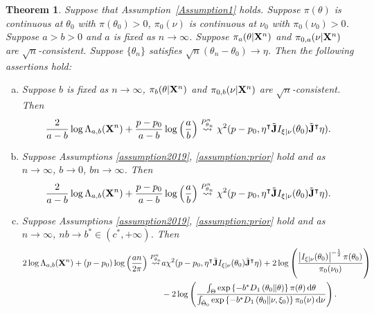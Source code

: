 \documentclass[11pt]{article}
\newcommand{\myT}{\intercal}
\theoremstyle{plain}
\newtheorem{theorem}{\quad\quad Theorem}
\theoremstyle{definition}
\theoremstyle{remark}
\begin{document}
\begin{theorem}\label{Thm:maintheorem}
    Suppose that Assumption~\ref{Assumption1} holds.
Suppose $\pi(\theta)$ is continuous at $\theta_0$ with $\pi(\theta_0)>0$, $\pi_0(\nu)$ is continuous at $\nu_0$ with $\pi_0 (\nu_0)> 0$.
Suppose $a>b>0$ and $a$ is fixed as $n\to \infty$.
    Suppose $\pi_a( \theta | \mathbf{X}^n)$ and $\pi_{0, a}(\nu | \mathbf{X}^n)$ are $\sqrt n$-consistent.
    Suppose $\{\theta_n\}$ satisfies $\sqrt{n}(\theta_n-\theta_0)\to \eta$.
Then the following assertions hold:
\begin{enumerate}[(a)]
        \item 
            Suppose $b$ is fixed  as $n\to \infty$,
            $\pi_b(\theta|\mathbf{X}^{n})$ and $\pi_{0,b}(\nu | \mathbf{X}^{n})$ are $\sqrt{n}$-consistent.
            Then
    $$
        \frac{2}{a-b}
        \log \Lambda_{a,b} (\BX^n)
        +\frac{p-p_0}{a-b}
        \log \left(\frac{a}{b}\right)
    \overset{P^n_{\theta_n}}{\rightsquigarrow} 
    \chi^2(p-p_0,\eta^\myT\tilde \BJ I_{\xi|\nu}(\theta_0) \tilde\BJ^\myT\eta)
.
    $$
\item
Suppose Assumptions
\ref{assumption2019}, \ref{assumption:prior} hold 
and
as $n \to \infty$, $b\to 0$, $bn \to \infty$.
Then
\begin{align*}
        \frac{2}{a-b}
    \log \Lambda_{a,b} (\BX^n)
+
\frac{p-p_0}{a-b}
\log \left(\frac{a}{b}\right)
\overset{P^n_{\theta_n}}{\rightsquigarrow}
    \chi^2(p-p_0, \eta^\myT\tilde \BJ I_{\xi|\nu}(\theta_0) \tilde\BJ^\myT\eta)
    .
\end{align*}

\item
Suppose Assumptions
\ref{assumption2019}, \ref{assumption:prior} hold
and    
as $n \to \infty$, $nb\to b^* \in (c^*, +\infty)$.
    Then
\begin{align*}
    2\log \Lambda_{a,b} (\BX^n)
+{(p-p_0)} \log \left( \frac{an}{2\pi} \right)
\overset{P^n_{\theta_n}}{\rightsquigarrow}
&
 a \chi^2 (p-p_0, \eta^\myT\tilde \BJ I_{\xi|\nu}(\theta_0) \tilde\BJ^\myT\eta )
 +
2\log\left( \frac{
        \left|I_{\xi| \nu} (\theta_0)\right|^{-\frac 1 2}
\pi(\theta_0)}{\pi_0(\nu_0)} \right)
\\
&
-2\log 
\left( 
\frac{
    \int_{\Theta} \exp\left\{ -b^* D_1\left( \theta_0 \| \theta \right)\right\} \pi(\theta) \, \mathrm d \theta 
}{
 \int_{\tilde \Theta_0} \exp\left\{ -b^* D_1\left( \theta_0 \| \nu, \xi_0 \right)\right\} \pi_0(\nu) \, \mathrm d \nu
}
\right)
.
\end{align*}
    \end{enumerate}
\end{theorem}
\end{document}
